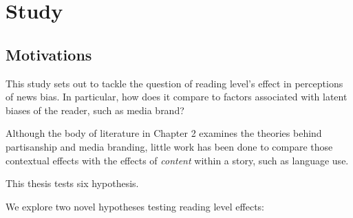 \chapter{Study}

\section{Motivations}






 
This study sets out to tackle the question of reading level's effect in perceptions of news bias. In particular, how does it compare to factors associated with latent biases of the reader, such as media brand?

Although the body of literature in Chapter 2 examines the theories behind partisanship and media branding, little work has been done to compare those contextual effects with the effects of \emph{content} within a story, such as language use.

This thesis tests six hypothesis.

We explore two novel hypotheses testing reading level effects:

